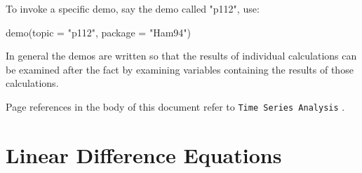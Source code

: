 \documentclass[a4paper]{article}
\renewcommand{\~}{\perispomeni}%
\newcommand{\TSA}{\texttt{Time Series Analysis} }
\begin{document}
To invoke a specific demo, say the demo called "p112", use:
\begin{Schunk}
\begin{Sinput}
 demo(topic = "p112", package = "Ham94")
\end{Sinput}
\end{Schunk}

In general the demos are written so that the results of individual calculations can be examined
after the fact by examining variables containing the results of those calculations.

Page references in the body of this document refer to \TSA.
\pagebreak{}
\tableofcontents
\pagebreak{}
\section{Linear Difference Equations}
\end{document}

